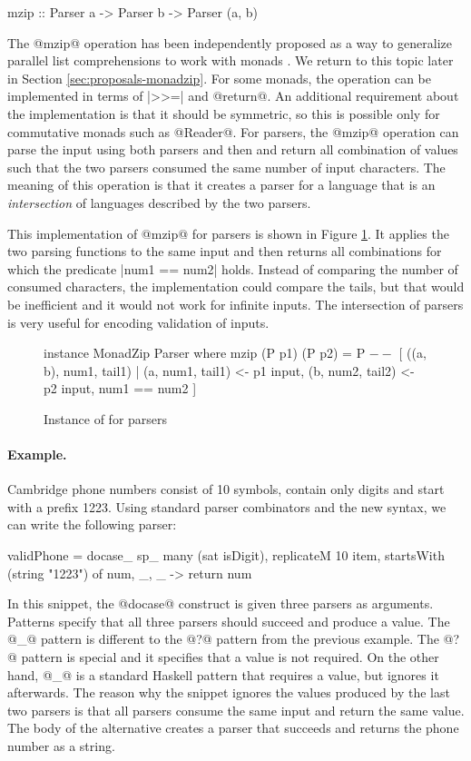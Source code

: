 \documentclass[preprint]{sigplanconf}
\begin{document}
\begin{code}
mzip :: Parser a -> Parser b -> Parser (a, b)
\end{code}
The @mzip@ operation has been independently proposed as a way to generalize parallel list 
comprehensions to work with monads \cite{bringbackmc}. We return to this topic later in Section 
\ref{sec:proposals-monadzip}. For some monads, the operation can be implemented in terms of |>>=| 
and @return@. An additional requirement about the implementation is that it should be symmetric, 
so this is possible only for commutative monads such as @Reader@. For parsers, the @mzip@ operation 
can parse the input using both parsers and then and return all combination of values such that the 
two parsers consumed the same number of input characters. The meaning of this operation is that it 
creates a parser for a language that is an \textit{intersection} of languages described by the 
two parsers.

This implementation of @mzip@ for parsers is shown in Figure \ref{fig:parser-monadzip}. It
applies the two parsing functions to the same input and then returns all combinations for which
the predicate |num1 == num2| holds. Instead of comparing the number of consumed characters, the 
implementation could compare the tails, but that would be inefficient and it would not work for
infinite inputs. The intersection of parsers is very useful for encoding validation of 
inputs.

\begin{figure}
\label{fig:parser-monadzip}
\begin{code}
instance MonadZip Parser where 
  mzip (P p1) (P p2) = P $  --$
    [ ((a, b), num1, tail1) |
         (a, num1, tail1) <- p1 input,
         (b, num2, tail2) <- p2 input, num1 == num2 ]
\end{code}
\caption{Instance of  for parsers}
\end{figure}

\paragraph{Example.}
Cambridge phone numbers consist of 10 symbols, contain only digits and start with 
a prefix 1223. Using standard parser combinators and the new syntax, we can write the 
following parser:

\begin{code}
validPhone = docase_
   sp_ many (sat isDigit), 
       replicateM 10 item,
       startsWith (string "1223") of
  num, _, _ -> return num
\end{code}
In this snippet, the @docase@ construct is given three parsers as arguments. Patterns specify
that all three parsers should succeed and produce a value. The @_@ pattern is different to the
@?@ pattern from the previous example. The @?@ pattern is special and it specifies that a value
is not required. On the other hand, @_@ is a standard Haskell pattern that requires
a value, but ignores it afterwards. The reason why the snippet ignores the values produced by the
last two parsers is that all parsers consume the same input and return the same value.
The body of the alternative creates a parser that succeeds and returns the phone number as
a string.
\end{document}
